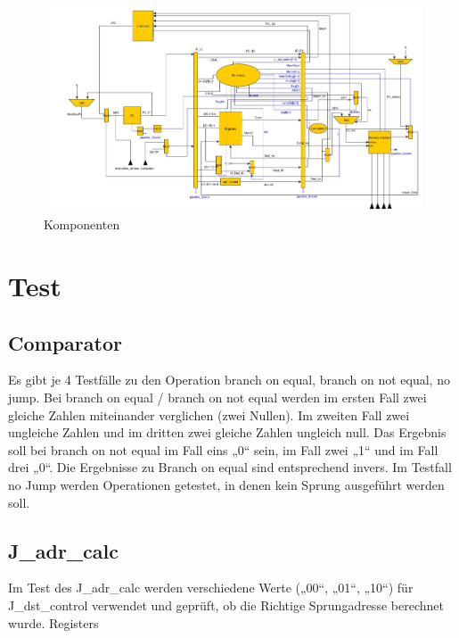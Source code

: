 \documentclass[11pt]{article} %
\begin{document}
\begin{figure}
\centering
\includegraphics[width=1.4\textwidth, angle=90]{Prozessorentwurf_Komponenten_jumps}
\caption{Komponenten}
\end{figure}

\newpage
\section{Test}
\subsection{Comparator}
Es gibt je 4 Testfälle zu den Operation branch on equal, branch on not equal, no jump.
Bei branch on equal / branch on not equal werden im ersten Fall zwei gleiche Zahlen miteinander verglichen (zwei Nullen). Im zweiten Fall zwei ungleiche Zahlen und im dritten zwei gleiche Zahlen ungleich null. Das Ergebnis soll bei branch on not equal im Fall eins „0“ sein, im Fall zwei „1“ und im Fall drei „0“. Die Ergebnisse zu Branch on equal sind entsprechend invers.
Im Testfall no Jump werden Operationen getestet, in denen kein Sprung ausgeführt werden soll.
\subsection{J\_adr\_calc}
Im Test des J\_adr\_calc werden verschiedene Werte („00“, „01“, „10“) für J\_dst\_control verwendet und geprüft, ob die Richtige Sprungadresse berechnet wurde.
Registers
\end{document}
